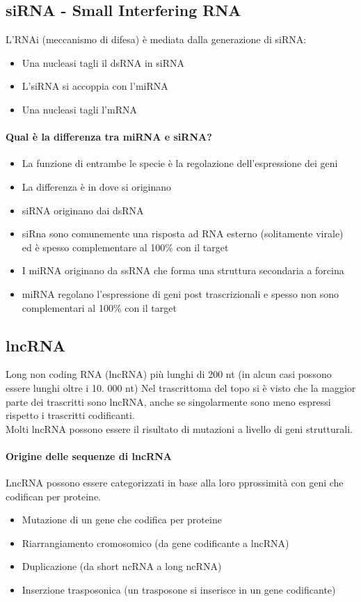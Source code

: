 \documentclass{article}
\begin{document}
\subsection{siRNA - Small Interfering RNA}
L'RNAi (meccanismo di difesa) è mediata dalla generazione di siRNA:
\begin{itemize}
    \item Una nucleasi tagli il dsRNA in siRNA
    \item L'siRNA si accoppia con l'miRNA
    \item Una nucleasi tagli l'mRNA
\end{itemize}
\paragraph{Qual è la differenza tra miRNA e siRNA?}
\begin{itemize}
    \item La funzione di entrambe le specie è la regolazione dell'espressione dei geni
    \item La differenza è in dove si originano
    \item siRNA originano dai dsRNA
    \item siRna sono comunemente una risposta ad RNA esterno (solitamente virale) ed è spesso complementare al 100\% con il target
    \item I miRNA originano da ssRNA che forma una struttura secondaria a forcina
    \item miRNA regolano l'espressione di geni post trascrizionali e spesso non sono complementari al 100\% con il target
\end{itemize}
\subsection{lncRNA}
Long non coding RNA (lncRNA) più lunghi di 200 nt (in alcun casi possono essere lunghi oltre i 10. 000 nt)
Nel trascrittoma del topo si è visto che la maggior parte dei trascritti sono lncRNA, anche se singolarmente sono meno espressi rispetto i trascritti codificanti.\\
Molti lncRNA possono essere il risultato di mutazioni a livello di geni strutturali. 
\paragraph{Origine delle sequenze di lncRNA}
LncRNA possono essere categorizzati in base alla loro pprossimità con geni che codifican per proteine.
\begin{itemize}
    \item Mutazione di un gene che codifica per proteine
    \item Riarrangiamento cromosomico (da gene codificante a lncRNA)
    \item Duplicazione (da short ncRNA a long ncRNA)
    \item Inserzione trasposonica (un trasposone si inserisce in un gene codificante)
\end{itemize}
\end{document}
